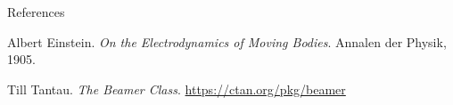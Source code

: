 \documentclass[aspectratio=169,xcolor=dvipsnames]{beamer}
\begin{document}
\begin{frame}{References}
  \begin{thebibliography}{9}
      Albert Einstein.
      \emph{On the Electrodynamics of Moving Bodies}.
      Annalen der Physik, 1905.
    
      Till Tantau.
      \emph{The Beamer Class}.
      \url{https://ctan.org/pkg/beamer}
  \end{thebibliography}
\end{frame}

%   
%   
\end{document}
